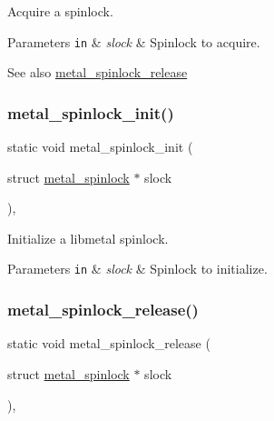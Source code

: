 Acquire a spinlock. 


\begin{DoxyParams}[1]{Parameters}
\mbox{\tt in}  & {\em slock} & Spinlock to acquire. \\
\hline
\end{DoxyParams}
\begin{DoxySeeAlso}{See also}
\hyperlink{group__spinlock_ga510a38b5255ebf26d279e8b5b7aaa976}{metal\+\_\+spinlock\+\_\+release} 
\end{DoxySeeAlso}
\mbox{\label{group__spinlock_ga4b326a00b704a510310776ee55ccb35e}} 
\subsubsection{\texorpdfstring{metal\+\_\+spinlock\+\_\+init()}{metal\_spinlock\_init()}}
{\footnotesize\ttfamily static void metal\+\_\+spinlock\+\_\+init (\begin{DoxyParamCaption}\item[{struct \hyperlink{structmetal__spinlock}{metal\+\_\+spinlock} $\ast$}]{slock }\end{DoxyParamCaption})\hspace{0.3cm}{\ttfamily [inline]}, {\ttfamily [static]}}



Initialize a libmetal spinlock. 


\begin{DoxyParams}[1]{Parameters}
\mbox{\tt in}  & {\em slock} & Spinlock to initialize. \\
\hline
\end{DoxyParams}
\mbox{\label{group__spinlock_ga510a38b5255ebf26d279e8b5b7aaa976}} 
\subsubsection{\texorpdfstring{metal\+\_\+spinlock\+\_\+release()}{metal\_spinlock\_release()}}
{\footnotesize\ttfamily static void metal\+\_\+spinlock\+\_\+release (\begin{DoxyParamCaption}\item[{struct \hyperlink{structmetal__spinlock}{metal\+\_\+spinlock} $\ast$}]{slock }\end{DoxyParamCaption})\hspace{0.3cm}{\ttfamily [inline]}, {\ttfamily [static]}}




